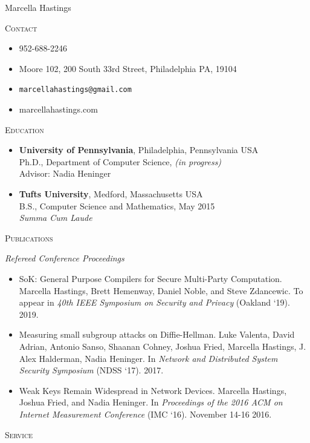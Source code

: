 \documentclass{article}
\begin{document}
Marcella Hastings

\hrulefill

\textsc{Contact}
\begin{itemize}[label={},noitemsep]
  \item 952-688-2246
  \item Moore 102, 200 South 33rd Street, Philadelphia PA, 19104
  \item \texttt{marcellahastings@gmail.com}
  \item marcellahastings.com
\end{itemize}

\textsc{Education}
\begin{itemize}[label={}]
  \item \textbf{University of Pennsylvania}, Philadelphia, Pennsylvania USA \\
    Ph.D., Department of Computer Science, \textit{(in progress)}\\
    Advisor: Nadia Heninger \\
    
  \item \textbf{Tufts University}, Medford, Massachusetts USA \\
    B.S., Computer Science and Mathematics, May 2015 \\
    \textit{Summa Cum Laude}
\end{itemize}

\textsc{Publications}

\textit{Refereed Conference Proceedings}
\begin{itemize}[label={}]
\item SoK: General Purpose Compilers for Secure Multi-Party Computation. 
Marcella Hastings, Brett Hemenway, Daniel Noble, and Steve Zdancewic.
To appear in \textit{40th IEEE Symposium on Security and Privacy} (Oakland `19). 2019.
\item Measuring small subgroup attacks on Diffie-Hellman. 
Luke Valenta, David Adrian, Antonio Sanso, Shaanan Cohney, Joshua Fried, Marcella Hastings, J. Alex Halderman, Nadia Heninger. 
In \textit{Network and Distributed System Security Symposium} (NDSS `17). 2017.
\item Weak Keys Remain Widespread in Network Devices. 
Marcella Hastings, Joshua Fried, and Nadia Heninger. 
In \textit{Proceedings of the 2016 ACM on Internet Measurement Conference} (IMC `16). November 14-16 2016.
\end{itemize}

\textsc{Service}
\end{document}
